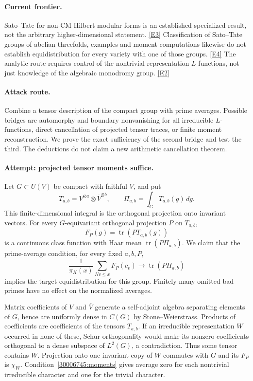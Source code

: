 \documentclass[11pt,a4paper]{article}
\newcommand{\eref}[2]{\hyperlink{extra:#1:#2}{[E#2]}}
\numberwithin{equation}{section}
\begin{document}
\paragraph{Current frontier.}
Sato--Tate for non-CM Hilbert modular forms is an established specialized
result, not the arbitrary higher-dimensional statement. \eref{30006745}{3}
Classification of Sato--Tate groups of abelian threefolds, examples and
moment computations likewise do not establish equidistribution for every
variety with one of those groups. \eref{30006745}{4} The analytic route requires
control of the nontrivial representation $L$-functions, not just knowledge
of the algebraic monodromy group. \eref{30006745}{2}

\paragraph{Attack route.}
Combine a tensor description of the compact group with prime averages.
Possible bridges are automorphy and boundary nonvanishing for all irreducible
$L$-functions, direct cancellation of projected tensor traces, or finite
moment reconstruction. We prove the exact sufficiency of the second bridge
and test the third. The deductions do not claim a new arithmetic
cancellation theorem.

\paragraph{Attempt: projected tensor moments suffice.}
Let $G\subset U(V)$ be compact with faithful $V$, and put
\[
 T_{a,b}=V^{\otimes a}\otimes\overline V^{\otimes b},\qquad
 \Pi_{a,b}=\int_G T_{a,b}(g)\,dg.
\]
This finite-dimensional integral is the orthogonal projection onto invariant
vectors. For every $G$-equivariant orthogonal projection $P$ on $T_{a,b}$,
\[
 F_P(g)=\operatorname{tr}(P T_{a,b}(g))
\]
is a continuous class function with Haar mean $\operatorname{tr}(P\Pi_{a,b})$.
We claim that the prime-average condition, for every fixed $a,b,P$,
\begin{equation}\label{30006745:moments}
 \frac1{\pi_K(x)}\sum_{Nv\le x}F_P(c_v)
       \longrightarrow\operatorname{tr}(P\Pi_{a,b})
\end{equation}
implies the target equidistribution for this group. Finitely many omitted
bad primes have no effect on the normalized averages.

Matrix coefficients of $V$ and $\overline V$ generate a self-adjoint algebra
separating elements of $G$, hence are uniformly dense in $C(G)$ by
Stone--Weierstrass. Products of coefficients are coefficients of the tensors
$T_{a,b}$. If an irreducible representation $W$ occurred in none of these,
Schur orthogonality would make its nonzero coefficients orthogonal to a
dense subspace of $L^2(G)$, a contradiction. Thus some tensor contains $W$.
Projection onto one invariant copy of $W$ commutes with $G$ and its $F_P$
is $\chi_W$. Condition~\eqref{30006745:moments} gives average zero for each
nontrivial irreducible character and one for the trivial character.
\end{document}
